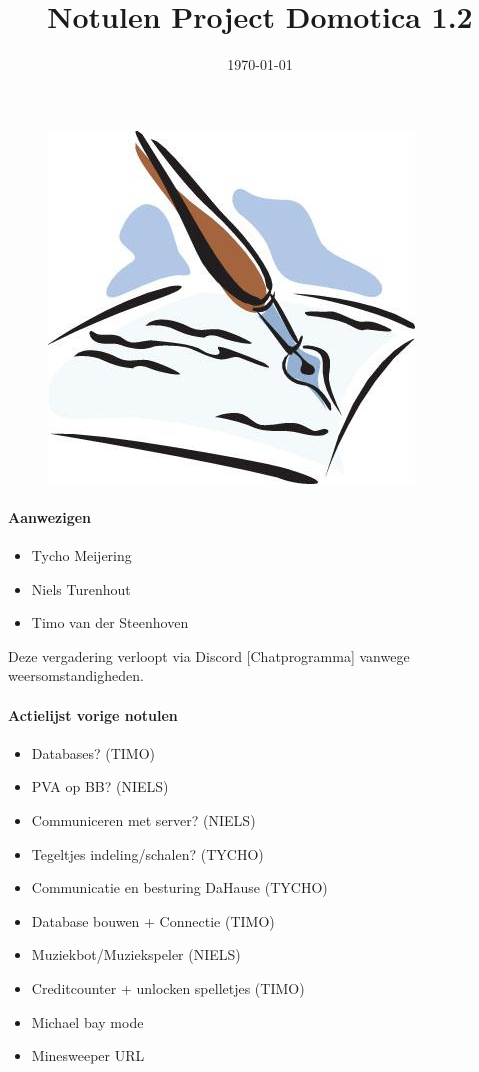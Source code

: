 \documentclass[11pt]{article}
\title{Notulen Project Domotica 1.2}
\date{\today} %
\begin{document}
\thispagestyle{empty}
\maketitle %
\begin{figure}[h]
	\includegraphics[width=\textwidth]{notulen}

\end{figure}
\newpage
\paragraph{Aanwezigen}

\begin{itemize}
	\item Tycho Meijering
	\item Niels Turenhout
	\item Timo van der Steenhoven
\end{itemize}
Deze vergadering verloopt via Discord [Chatprogramma] vanwege
weersomstandigheden.

\paragraph{Actielijst vorige notulen}
\begin{itemize}
\item Databases? (TIMO)
\item PVA op BB? (NIELS)
\item Communiceren met server? (NIELS)
\item Tegeltjes indeling/schalen? (TYCHO)
\item Communicatie en besturing DaHause (TYCHO)
\item Database bouwen + Connectie (TIMO)
\item Muziekbot/Muziekspeler (NIELS)
\item Creditcounter + unlocken spelletjes (TIMO)
\item Michael bay mode
\item Minesweeper URL
\end{itemize}
\end{document}
